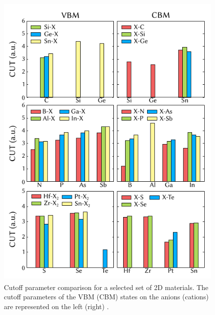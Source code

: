 \begin{figure}[!ht]
        \centering
        \includegraphics[width=13cm,height=15cm]{images/cut_element_2d.png}
        \caption{Cutoff parameter comparison for a selected set of 2D
    materials. The cutoff parameters of the VBM (CBM) states on the
   anions (cations) are represented on the left (right)\cite{PhysRevB.97.045426} .}
        \label{cut-element-2d}
\end{figure}

